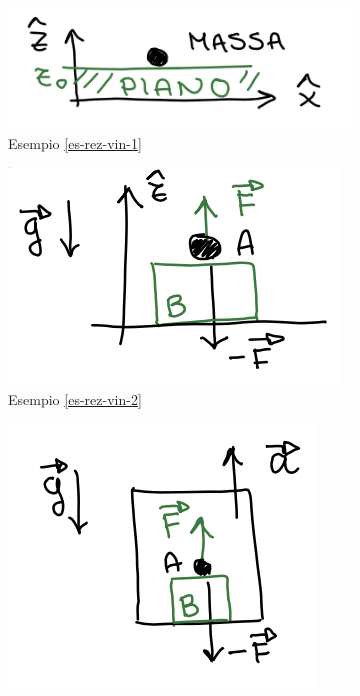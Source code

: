 \begin{figure}[h!]
    \vspace{-10pt}
    \centering
    \begin{subfigure}[b]{0.25\textwidth}
        \centering
        \includegraphics[width=\textwidth]{images/esempio-reazioni-vincolari-1.png}
        \caption*{Esempio \ref{es-rez-vin-1}}
    \end{subfigure}
    \begin{subfigure}[b]{0.25\textwidth}
        \centering
        \includegraphics[width=\textwidth]{images/esempio-reazioni-vincolari-2.png}
        \caption*{Esempio \ref{es-rez-vin-2}}
    \end{subfigure}
    \begin{subfigure}[b]{0.2\textwidth}
        \centering
        \includegraphics[width=\textwidth]{images/esempio-reazioni-vincolari-3.png}

\end{subfigure}
\end{figure}
